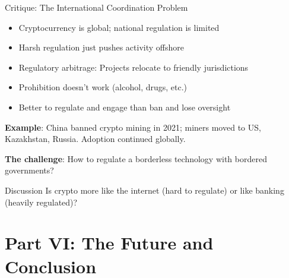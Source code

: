 ﻿\documentclass[aspectratio=169,11pt]{beamer}
\begin{document}
\begin{frame}{Critique: The International Coordination Problem}
\begin{objectionbox}
\begin{itemize}
    \item Cryptocurrency is global; national regulation is limited
    \item Harsh regulation just pushes activity offshore
    \item Regulatory arbitrage: Projects relocate to friendly jurisdictions
    \item Prohibition doesn't work (alcohol, drugs, etc.)
    \item Better to regulate and engage than ban and lose oversight
\end{itemize}
\end{objectionbox}

\vspace{0.3em}
\textbf{Example}: China banned crypto mining in 2021; miners moved to US, Kazakhstan, Russia. Adoption continued globally.

\textbf{The challenge}: How to regulate a borderless technology with bordered governments?

\begin{alertblock}{Discussion}
Is crypto more like the internet (hard to regulate) or like banking (heavily regulated)?
\end{alertblock}
\end{frame}

\section{Part VI: The Future and Conclusion}
\end{document}
